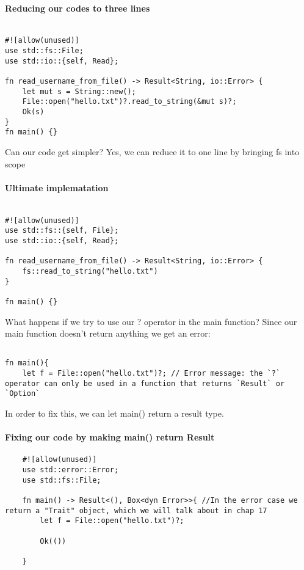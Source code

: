 \paragraph*{Reducing our codes to three lines}
\begin{lstlisting}   

#![allow(unused)]
use std::fs::File;
use std::io::{self, Read};

fn read_username_from_file() -> Result<String, io::Error> {
    let mut s = String::new();
    File::open("hello.txt")?.read_to_string(&mut s)?;
    Ok(s) 
}
fn main() {}
\end{lstlisting}

Can our code get simpler? Yes, we can reduce it to one line by bringing fs into scope
\paragraph*{Ultimate implematation}
\begin{lstlisting}

#![allow(unused)]
use std::fs::{self, File};
use std::io::{self, Read};

fn read_username_from_file() -> Result<String, io::Error> {
    fs::read_to_string("hello.txt")
}

fn main() {}
\end{lstlisting}

What happens if we try to use our ? operator in the main function? Since our main function doesn't return anything we get an error:

\begin{lstlisting}

fn main(){
    let f = File::open("hello.txt")?; // Error message: the `?` operator can only be used in a function that returns `Result` or `Option`
\end{lstlisting}

In order to fix this, we can let main() return a result type.

\paragraph*{Fixing our code by making main() return Result}
\begin{lstlisting}
    #![allow(unused)]
    use std::error::Error;
    use std::fs::File;
    
    fn main() -> Result<(), Box<dyn Error>>{ //In the error case we return a "Trait" object, which we will talk about in chap 17 
        let f = File::open("hello.txt")?;
    
        Ok(())
    
    }
\end{lstlisting}


